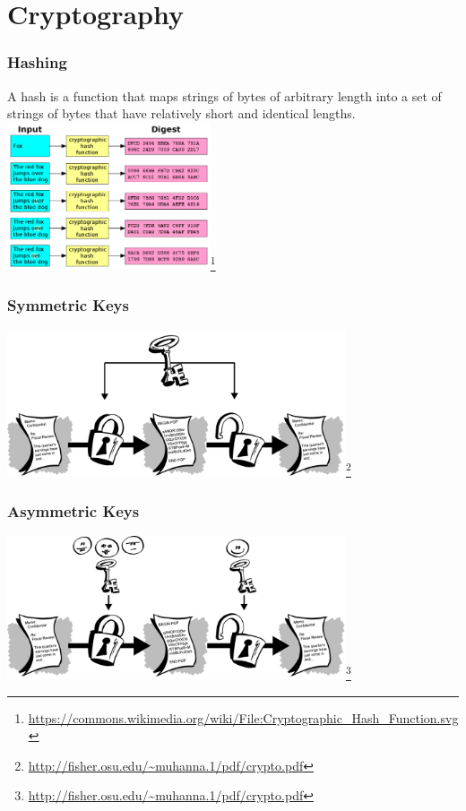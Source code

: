 \documentclass{beamer}
\begin{document}
\section{Cryptography}

\begin{frame}
\frametitle{Hashing}
\begin{multicols}{2}
  A hash is a function that maps strings of bytes of arbitrary length into a set of strings of bytes that have relatively short and identical lengths.
  \columnbreak
  \includegraphics[width=6cm]{hash.png}\footnote{\url{https://commons.wikimedia.org/wiki/File:Cryptographic_Hash_Function.svg}}
\end{multicols}
\end{frame}

\begin{frame}
\frametitle{Symmetric Keys}
\begin{center}
  \includegraphics[width=10cm]{symmetric_key.png}\footnote{\url{http://fisher.osu.edu/~muhanna.1/pdf/crypto.pdf}}
\end{center}
\end{frame}

\begin{frame}
\frametitle{Asymmetric Keys}
\begin{center}
  \includegraphics[width=10cm]{asymmetric_keys.png}\footnote{\url{http://fisher.osu.edu/~muhanna.1/pdf/crypto.pdf}}
\end{center}
\end{frame}
\end{document}
